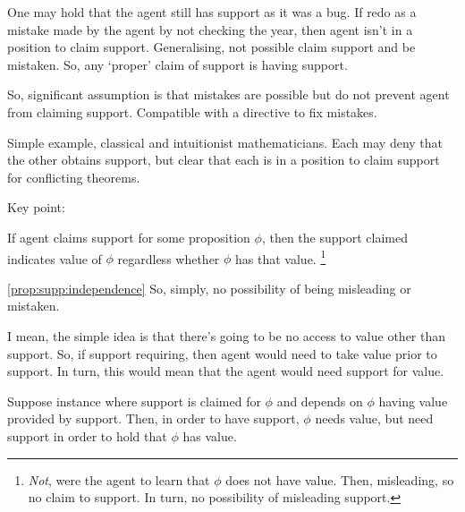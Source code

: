 \begin{note}[Support]
  One may hold that the agent still has support as it was a bug.
  If redo as a mistake made by the agent by not checking the year, then agent isn't in a position to claim support.
  Generalising, not possible claim support and be mistaken.
  So, any `proper' claim of support is having support.

  So, significant assumption is that mistakes are possible but do not prevent agent from claiming support.
  Compatible with a directive to fix mistakes.

  Simple example, classical and intuitionist mathematicians.
  Each may deny that the other obtains support, but clear that each is in a position to claim support for conflicting theorems.

  Key point:
  \begin{proposition}\label{prop:supp:independence}
    If agent claims support for some proposition \(\phi\), then the support claimed indicates value of \(\phi\) regardless whether \(\phi\) has that value.\nolinebreak
    \footnote{
      \emph{Not}, were the agent to learn that \(\phi\) does not have value.
      Then, misleading, so no claim to support.
      In turn, no possibility of misleading support.
    }
  \end{proposition}
  \autoref{prop:supp:independence} So, simply, no possibility of being misleading or mistaken.

  I mean, the simple idea is that there's going to be no access to value other than support.
  So, if support requiring, then agent would need to take value prior to support.
  In turn, this would mean that the agent would need support for value.



  Suppose instance where support is claimed for \(\phi\) and depends on \(\phi\) having value provided by support.
  Then, in order to have support, \(\phi\) needs value, but need support in order to hold that \(\phi\) has value.


\end{note}
